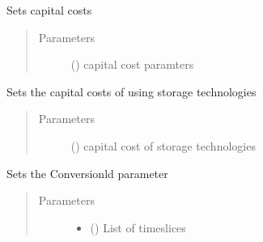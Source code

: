 \documentclass[a4paper,12pt,english]{article}
\begin{document}
\begin{fulllineitems}
\begin{fulllineitems}
\label{\detokenize{GOCPI:GOCPI.CreateCases.CreateCases.set_capital_cost}}
Sets capital costs
\begin{quote}\begin{description}
\item[{Parameters}] \leavevmode
{} (\sphinxstyleliteralemphasis{\sphinxupquote{, }}) \textendash{} capital cost paramters

\end{description}\end{quote}

\end{fulllineitems}


\begin{fulllineitems}
\label{\detokenize{GOCPI:GOCPI.CreateCases.CreateCases.set_capital_cost_storage}}
Sets the capital costs of using storage technologies
\begin{quote}\begin{description}
\item[{Parameters}] \leavevmode
{} (\sphinxstyleliteralemphasis{\sphinxupquote{, }}) \textendash{} capital cost of storage technologies

\end{description}\end{quote}

\end{fulllineitems}


\begin{fulllineitems}
\label{\detokenize{GOCPI:GOCPI.CreateCases.CreateCases.set_conversion_ld}}
Sets the Conversionld parameter
\begin{quote}\begin{description}
\item[{Parameters}] \leavevmode\begin{itemize}
\item {} 
 () \textendash{} List of timeslices


\end{itemize}
\end{description}
\end{quote}
\end{fulllineitems}
\end{fulllineitems}
\end{document}
